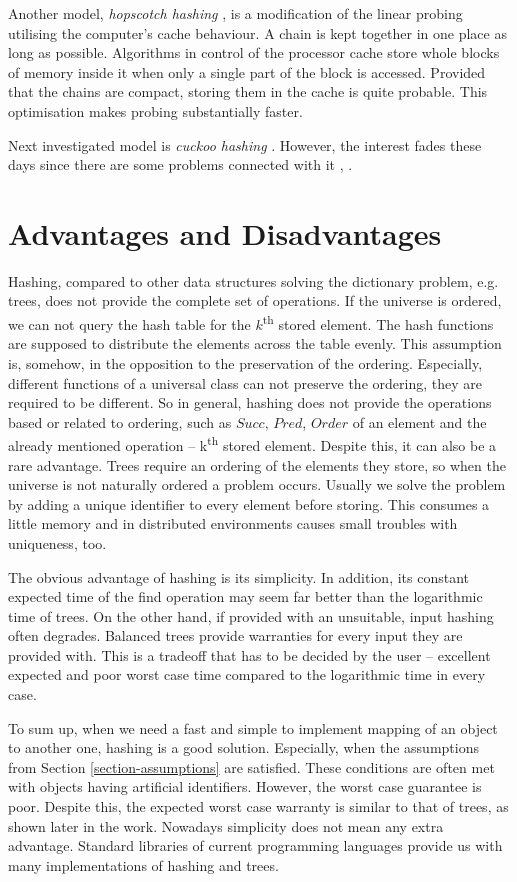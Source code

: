 Another model, \emph{hopscotch hashing} \cite{DBLP:conf/wdag/HerlihyST08}, is a modification of the linear probing utilising the computer's cache behaviour. A chain is kept together in one place as long as possible. Algorithms in control of the processor cache store whole blocks of memory inside it when only a single part of the block is accessed. Provided that the chains are compact, storing them in the cache is quite probable. This optimisation makes probing substantially faster.

Next investigated model is \emph{cuckoo hashing} \cite{782440}. However, the interest fades these days since there are some problems connected with it \cite{DBLP:conf/sofsem/DietzfelbingerS09}, \cite{1496857}.

\section{Advantages and Disadvantages}
Hashing, compared to other data structures solving the dictionary problem, e.g. trees, does not provide the complete set of operations. If the universe is ordered, we can not query the hash table for the $k$\textsuperscript{th} stored element. The hash functions are supposed to distribute the elements across the table evenly. This assumption is, somehow, in the opposition to the preservation of the ordering. Especially, different functions of a universal class can not preserve the ordering, they are required to be different. So in general, hashing does not provide the operations based or related to ordering, such as $Succ$, $Pred$, $Order$ of an element and the already mentioned operation -- k\textsuperscript{th} stored element. Despite this, it can also be a rare advantage. Trees require an ordering of the elements they store, so when the universe is not naturally ordered a problem occurs. Usually we solve the problem by adding a unique identifier to every element before storing. This consumes a little memory and in distributed environments causes small troubles with uniqueness, too.

The obvious advantage of hashing is its simplicity. In addition, its constant expected time of the find operation may seem far better than the logarithmic time of trees. On the other hand, if provided with an unsuitable, input hashing often degrades. Balanced trees provide warranties for every input they are provided with. This is a tradeoff that has to be decided by the user -- excellent expected and poor worst case time compared to the logarithmic time in every case.

To sum up, when we need a fast and simple to implement mapping of an object to another one, hashing is a good solution. Especially, when the assumptions from Section \ref{section-assumptions} are satisfied. These conditions are often met with objects having artificial identifiers. However, the worst case guarantee is poor. Despite this, the expected worst case warranty is similar to that of trees, as shown later in the work. Nowadays simplicity does not mean any extra advantage. Standard libraries of current programming languages provide us with many implementations of hashing and trees.

